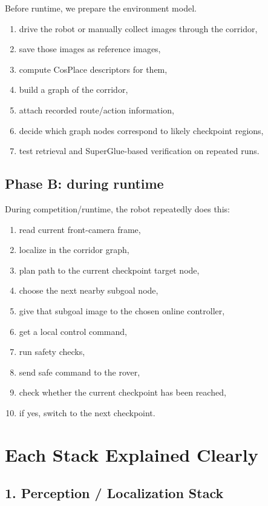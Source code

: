 \documentclass[11pt,a4paper]{article}
\begin{document}
Before runtime, we prepare the environment model.

\begin{enumerate}[nosep]
  \item drive the robot or manually collect images through the corridor,
  \item save those images as reference images,
  \item compute CosPlace descriptors for them,
  \item build a graph of the corridor,
  \item attach recorded route/action information,
  \item decide which graph nodes correspond to likely checkpoint regions,
  \item test retrieval and SuperGlue-based verification on repeated runs.
\end{enumerate}

\subsection{Phase B: during runtime}

During competition/runtime, the robot repeatedly does this:

\begin{enumerate}[nosep]
  \item read current front-camera frame,
  \item localize in the corridor graph,
  \item plan path to the current checkpoint target node,
  \item choose the next nearby subgoal node,
  \item give that subgoal image to the chosen online controller,
  \item get a local control command,
  \item run safety checks,
  \item send safe command to the rover,
  \item check whether the current checkpoint has been reached,
  \item if yes, switch to the next checkpoint.
\end{enumerate}


\section{Each Stack Explained Clearly}

\subsection{1. Perception / Localization Stack}
\end{document}
